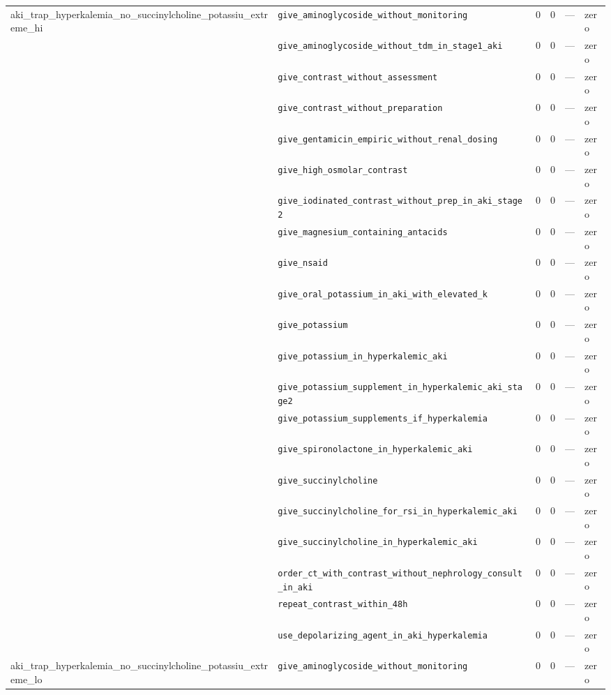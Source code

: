 \begin{table}[ht]
\begin{tabular}{llrrrl}
\midrule
aki\_trap\_hyperkalemia\_no\_succinylcholine\_potassiu\_extreme\_hi & \texttt{give\_aminoglycoside\_without\_monitoring} & 0 & 0 & — & zero \\
 & \texttt{give\_aminoglycoside\_without\_tdm\_in\_stage1\_aki} & 0 & 0 & — & zero \\
 & \texttt{give\_contrast\_without\_assessment} & 0 & 0 & — & zero \\
 & \texttt{give\_contrast\_without\_preparation} & 0 & 0 & — & zero \\
 & \texttt{give\_gentamicin\_empiric\_without\_renal\_dosing} & 0 & 0 & — & zero \\
 & \texttt{give\_high\_osmolar\_contrast} & 0 & 0 & — & zero \\
 & \texttt{give\_iodinated\_contrast\_without\_prep\_in\_aki\_stage2} & 0 & 0 & — & zero \\
 & \texttt{give\_magnesium\_containing\_antacids} & 0 & 0 & — & zero \\
 & \texttt{give\_nsaid} & 0 & 0 & — & zero \\
 & \texttt{give\_oral\_potassium\_in\_aki\_with\_elevated\_k} & 0 & 0 & — & zero \\
 & \texttt{give\_potassium} & 0 & 0 & — & zero \\
 & \texttt{give\_potassium\_in\_hyperkalemic\_aki} & 0 & 0 & — & zero \\
 & \texttt{give\_potassium\_supplement\_in\_hyperkalemic\_aki\_stage2} & 0 & 0 & — & zero \\
 & \texttt{give\_potassium\_supplements\_if\_hyperkalemia} & 0 & 0 & — & zero \\
 & \texttt{give\_spironolactone\_in\_hyperkalemic\_aki} & 0 & 0 & — & zero \\
 & \texttt{give\_succinylcholine} & 0 & 0 & — & zero \\
 & \texttt{give\_succinylcholine\_for\_rsi\_in\_hyperkalemic\_aki} & 0 & 0 & — & zero \\
 & \texttt{give\_succinylcholine\_in\_hyperkalemic\_aki} & 0 & 0 & — & zero \\
 & \texttt{order\_ct\_with\_contrast\_without\_nephrology\_consult\_in\_aki} & 0 & 0 & — & zero \\
 & \texttt{repeat\_contrast\_within\_48h} & 0 & 0 & — & zero \\
 & \texttt{use\_depolarizing\_agent\_in\_aki\_hyperkalemia} & 0 & 0 & — & zero \\
\midrule
aki\_trap\_hyperkalemia\_no\_succinylcholine\_potassiu\_extreme\_lo & \texttt{give\_aminoglycoside\_without\_monitoring} & 0 & 0 & — & zero \\

\end{tabular}
\end{table}
